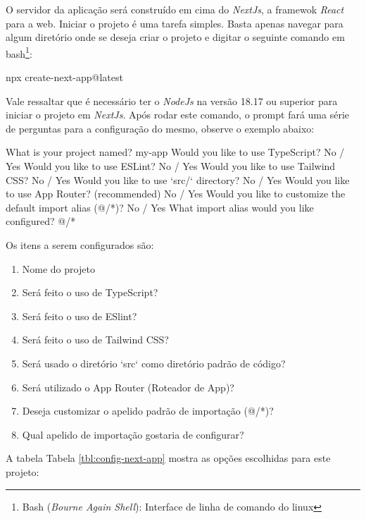 O servidor da aplicação será construído em cima do \textit{NextJs}, a
framewok \textit{React} para a
\acrshort{web}.
Iniciar o projeto é uma tarefa simples. Basta apenas navegar
para algum diretório onde se deseja criar o projeto e
digitar o seguinte comando em
\acrshort{bash}\footnote{Bash (\textit{Bourne Again Shell}): Interface de linha de comando do linux
}:

\begin{createNextJsCommand}
npx create-next-app@latest
\end{createNextJsCommand}

Vale ressaltar que é necessário ter o \textit{NodeJs} na versão 18.17 ou superior
para iniciar o projeto em \textit{NextJs}. Após rodar este comando, o prompt fará uma
série de perguntas para a configuração do mesmo, observe o exemplo abaixo:

\begin{promptNextJs}
What is your project named? my-app
Would you like to use TypeScript? No / Yes
Would you like to use ESLint? No / Yes
Would you like to use Tailwind CSS? No / Yes
Would you like to use `src/` directory? No / Yes
Would you like to use App Router? (recommended) No / Yes
Would you like to customize the default import alias (@/*)? No / Yes
What import alias would you like configured? @/*
\end{promptNextJs}

Os itens a serem configurados são:

\begin{enumerate}
        
	\item Nome do projeto
	\item Será feito o uso de TypeScript?
	\item Será feito o uso de ESlint?
	\item Será feito o uso de Tailwind CSS?
	\item Será usado o diretório `src` como diretório padrão de código?
	\item Será utilizado o App Router (Roteador de App)?
	\item Deseja customizar o apelido padrão de importação (@/*)?
	\item Qual apelido de importação gostaria de configurar?
    
\end{enumerate}

A tabela
Tabela \ref{tbl:config-next-app}
mostra as opções escolhidas para este projeto:

